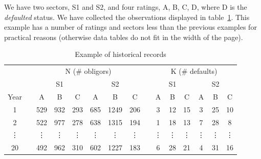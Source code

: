 \documentclass[11pt,fleqn]{book} %
\begin{document}
\begin{example}[]
	We have two sectors, S1 and S2, and four ratings, A, B, C, D, where 
	D is the \emph{defaulted} status. We have collected the observations displayed
	in table~\ref{table:histdata}.
	This example has a number of ratings and sectors less than the previous 
	examples for practical reasons (otherwise data tables do not fit 
	in the width of the page).
	\begin{table}[!ht]
		\centering
		\begin{tabular}{cc|c|c|c||c|c|c|  c  |c|c|c||c|c|c|}
			\cline{3-8} \cline{10-15}
			& & \multicolumn{6}{|c|}{N (\# obligors)} & & \multicolumn{6}{|c|}{K (\# defaults)} \\
			\cline{3-8} \cline{10-15}
			& & \multicolumn{3}{|c||}{S1} & \multicolumn{3}{|c|}{S2} & & \multicolumn{3}{|c||}{S1} & \multicolumn{3}{|c|}{S2} \\
			\cline{1-1} \cline{3-8} \cline{10-15}
			\multicolumn{1}{|c|}{Year} & & A & B & C & A & B & C & & A & B & C & A & B & C \\
			\cline{1-1} \cline{3-8} \cline{10-15}
			\multicolumn{1}{|c|}{1} & & 529 & 932 & 293 & 685 & 1249 & 206 & & 3 & 12 & 15 & 3 & 25 & 10 \\
			\cline{1-1} \cline{3-8} \cline{10-15}
			\multicolumn{1}{|c|}{2} & & 522 & 977 & 278 & 638 & 1315 & 194 & & 1 & 18 & 13 & 7 & 28 & 8 \\
			\cline{1-1} \cline{3-8} \cline{10-15}
			\multicolumn{1}{|c|}{\vdots} & & \vdots & \vdots & \vdots & \vdots & \vdots & \vdots & & \vdots & \vdots & \vdots & \vdots & \vdots & \vdots \\
			\cline{1-1} \cline{3-8} \cline{10-15}
			\multicolumn{1}{|c|}{20} & & 492 & 962 & 310 & 602 & 1227 & 183 & & 6 & 28 & 21 & 4 & 31 & 16 \\
			\cline{1-1} \cline{3-8} \cline{10-15}
		\end{tabular}
		\caption{Example of historical records}
		\label{table:histdata}
	\end{table}
\end{example}

\end{document}
